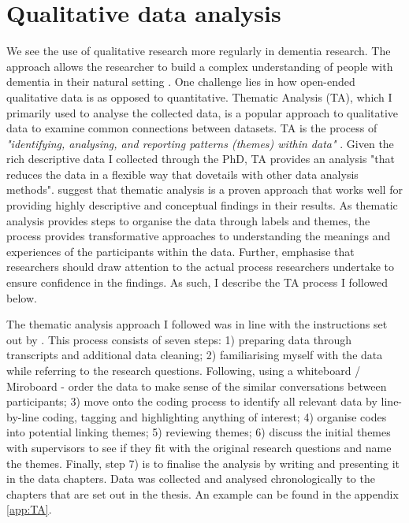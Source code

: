\section{Qualitative data analysis}
\label{QualDataAnalysis}
We see the use of qualitative research more regularly in dementia research. The approach allows the researcher to build a complex understanding of people with dementia in their natural setting \citep{mckeown_actively_2009}. One challenge lies in how open-ended qualitative data is as opposed to quantitative. Thematic Analysis (TA), which I primarily used to analyse the collected data, is a popular approach to qualitative data to examine common connections between datasets. TA is the process of \textit{"identifying, analysing, and reporting patterns (themes) within data"} \citep{braun_using_2006}. Given the rich descriptive data I collected through the PhD, TA provides an analysis "that reduces the data in a flexible way that dovetails with other data analysis methods". \citep{kiger2020thematic} suggest that thematic analysis is a proven approach that works well for providing highly descriptive and conceptual findings in their results. As thematic analysis provides steps to organise the data through labels and themes, the process provides transformative approaches to understanding the meanings and experiences of the participants within the data. Further, \cite{braun2012thematic} emphasise that researchers should draw attention to the actual process researchers undertake to ensure confidence in the findings. As such, I describe the TA process I followed below.

The thematic analysis approach I followed was in line with the instructions set out by \cite{braun_one_2020}. This process consists of seven steps: 1) preparing data through transcripts and additional data cleaning; 2) familiarising myself with the data while referring to the research questions. Following, using a whiteboard / Miroboard - order the data to make sense of the similar conversations between participants; 3) move onto the coding process to identify all relevant data by line-by-line coding, tagging and highlighting anything of interest; 4) organise codes into potential linking themes; 5) reviewing themes; 6) discuss the initial themes with supervisors to see if they fit with the original research questions and name the themes. Finally, step 7) is to finalise the analysis by writing and presenting it in the data chapters. Data was collected and analysed chronologically to the chapters that are set out in the thesis. An example can be found in the appendix \ref{app:TA}.


